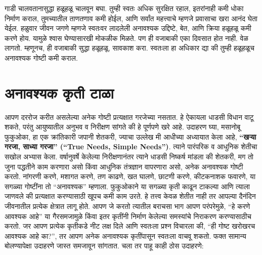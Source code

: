 गाडी चालवतानासुद्धा हळूहळू चालवून बघा. तुम्ही स्वतः अधिक सुरक्षित रहाल, इतरांनाही कमी धोका निर्माण कराल, तुमच्यातील ताणतणाव कमी होईल, आणि सर्वांत महत्त्वाचे म्हणजे प्रवासाचा खरा आनंद घेता येईल.
हळुवार जीवन जगणे म्हणजे स्वतःवर लादलेली अनावश्यक उद्दिष्टे, बेत, आणि क्रिया हळूहळू कमी करणे होय. यामुळे श्वास घेण्यासारखी मोकळीक मिळते. पण ही वजाबाकी एका दिवसात होत नाही. वेळ लागतो. म्हणूनच, ही वजाबाकी सुद्धा हळूहळू, सावकाश करा. स्वतःला हा अधिकार द्या की तुम्ही हळूहळूच अनावश्यक गोष्टी कमी कराल.


 \chapter{अनावश्यक कृती टाळा}
आपण दररोज करीत असलेल्या अनेक गोष्टी प्रत्यक्षात गरजेच्या नसतात. हे ऐकायला धाडसी विधान वाटू शकते, परंतु आयुष्यातील अनुभव व निरीक्षण सांगते की हे पूर्णपणे खरे आहे.
उदाहरण घ्या,  मसानोबू फुकुओका, हा एक क्रांतिकारी जपानी शेतकरी, ज्याचा उल्लेख मी आधीच्या अध्यायात केला आहे,  \textbf{“खऱ्या गरजा, साध्या गरजा” (“True Needs, Simple Needs”)}. त्याने पारंपरिक व आधुनिक शेतीचा सखोल अभ्यास केला. वर्षानुवर्षे केलेल्या निरीक्षणानंतर त्याने धाडसी निष्कर्ष मांडला की शेतकरी, मग तो जुना पद्धतीने काम करणारा असो किंवा आधुनिक तंत्रज्ञान वापरणारा असो, अनेक अनावश्यक गोष्टी करतो.
नांगरणी करणे, मशागत करणे, तण काढणे, खत घालणे, छाटणी करणे, कीटकनाशक फवारणे,  या सगळ्या गोष्टींना तो “अनावश्यक” म्हणाला. फुकुओकाने या सगळ्या कृती काढून टाकल्या आणि त्याला जाणवले की प्रत्यक्षात करण्यासाठी खूपच कमी काम उरते.
हे तत्त्व केवळ शेतीत नाही तर आपल्या दैनंदिन जीवनातील प्रत्येक क्षेत्रात लागू होते. आपण जे करतो त्यातील बराचसा भाग आपण परंपरेमुळे, “हे करणे आवश्यक आहे” या गैरसमजामुळे किंवा इतर कृतींनी निर्माण केलेल्या समस्यांचे निराकरण करण्यासाठीच करतो. जर आपण प्रत्येक कृतीकडे नीट लक्ष दिले आणि स्वतःला प्रश्न विचारला की,  “ही गोष्ट खरोखरच आवश्यक आहे का?”,  तर आपण अनेक अनावश्यक कृतींपासून स्वतःला वाचवू शकतो.
फक्त सामान्य बोलण्यापेक्षा उदाहरणे जास्त समजावून सांगतात. चला तर पाहू काही ठोस उदाहरणे:
